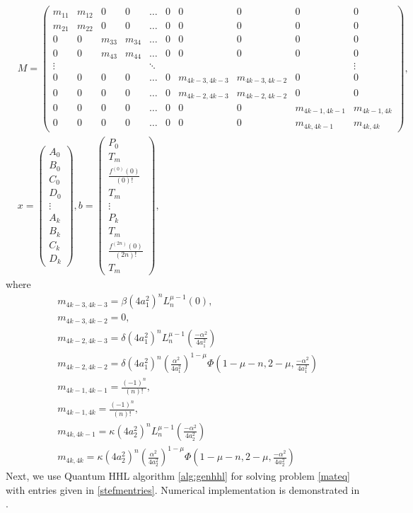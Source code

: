 \documentclass[review]{elsarticle}
\begin{document}
\begin{align}
&M=\begin{pmatrix}
m_{11}&m_{12}&0&0&\dots&0&0&0&0&0\\
m_{21}&m_{22}&0&0&\dots&0&0&0&0&0\\
0&0&m_{33}&m_{34}&\dots&0&0&0&0&0\\
0&0&m_{43}&m_{44}&\dots&0&0&0&0&0\\
\vdots&&&&\ddots&&&&&\vdots\\
0&0&0&0&\dots&0&m_{4k-3,4k-3}&m_{4k-3,4k-2}&0&0\\
0&0&0&0&\dots&0&m_{4k-2,4k-3}&m_{4k-2,4k-2}&0&0\\
0&0&0&0&\dots&0&0&0&m_{4k-1,4k-1}&m_{4k-1,4k}\\
0&0&0&0&\dots&0&0&0&m_{4k,4k-1}&m_{4k,4k}
\end{pmatrix},\label{twophase_m_entries}
\\&x=\begin{pmatrix}A_0\\B_0\\C_0\\D_0\\\vdots\\A_k\\B_k\\C_k\\D_k\end{pmatrix}, 
b=\begin{pmatrix} P_0\\
T_m\\
\frac{f^{(0)}(0)}{\left(0\right)!}\\
T_m\\\vdots\\P_k\\
T_m\\
\frac{f^{(2n)}(0)}{\left(2n\right)!}\\
T_m\end{pmatrix}\nonumber,
\end{align}
where
\begin{align*}
&m_{4k-3,4k-3}=\beta\left(4a_1^2\right)^n L_n^{\mu -1}\left(0\right),\\ 
&m_{4k-3,4k-2}=0,\\
&m_{4k-2,4k-3}=\delta\left(4a_1^2\right)^n L_n^{\mu -1}\left(\frac{-\alpha^2}{4a_1^2}\right)\\
&m_{4k-2,4k-2}= \delta\left(4a_1^2\right)^n\left( \frac{\alpha^2}{4a_1^2} \right)^{1-\mu}\Phi\left(1-\mu-n, 2-\mu,\frac{-\alpha^2}{4a_1^2}\right)\\
&m_{4k-1,4k-1}=\frac{(-1)^n}{(n)!},\\
&m_{4k-1,4k}=\frac{(-1)^n}{(n)!},\\
&m_{4k,4k-1}=\kappa\left(4a_2^2\right)^n L_n^{\mu -1}\left(\frac{-\alpha^2}{4a_2^2}\right)\\
&m_{4k,4k}= \kappa\left(4a_2^2\right)^n\left( \frac{\alpha^2}{4a_2^2} \right)^{1-\mu}\Phi\left(1-\mu-n, 2-\mu,\frac{-\alpha^2}{4a_2^2}\right)
\end{align*}
Next, we use Quantum HHL algorithm \ref{alg:genhhl} for solving problem \ref{mateq} with entries given in \ref{stefmentries}. Numerical implementation is demonstrated in \cite{SarFirst}.
\end{document}
